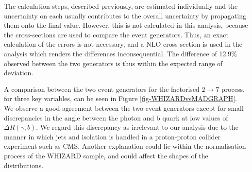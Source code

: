 The calculation steps, described previously, are estimated individually and the uncertainty on each usually contributes to the overall uncertainty by propagating them onto the final value. However, this is not calculated in this analysis, because the cross-sections are used to compare the event generators. Thus, an exact calculation of the errors is not necessary, and a NLO cross-section is used in the analysis which renders the differences inconsequential. The difference of 12.9\% observed between the two generators is thus within the expected range of deviation. 

A comparison between the two event generators for the factorised $2 \to 7$ process, for three key variables, can be seen in Figure \ref{fig-WHIZARDvsMADGRAPH}. We observe a good agreement between the two event generators except for small discrepancies in the angle between the photon and b quark at low values of $\Delta R (\gamma, b)$. We regard this discrepancy as irrelevant to our analysis due to the manner in which jets and isolation is handled in a proton-proton collider experiment such as CMS. Another explanation could lie within the normalisation process of the WHIZARD sample, and could affect the shapes of the distributions.\ 

